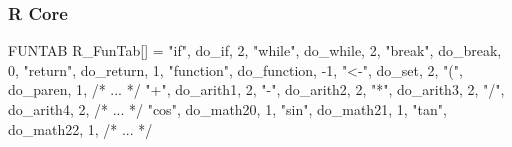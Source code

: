 \documentclass{beamer}
\begin{document}
\begin{frame}[fragile]
    \frametitle{R Core}

\begin{ccode}
FUNTAB R_FunTab[] = {
  {"if",        do_if,        2},
  {"while",     do_while,     2},
  {"break",     do_break,     0},
  {"return",    do_return,    1},
  {"function",  do_function,  -1},
  {"<-",        do_set,       2},
  {"(",         do_paren,     1},
  /* ... */
  {"+",         do_arith1,    2},
  {"-",         do_arith2,    2},
  {"*",         do_arith3,    2},
  {"/",         do_arith4,    2},
  /* ... */
  {"cos",       do_math20,    1},
  {"sin",       do_math21,    1},
  {"tan",       do_math22,    1},
  /* ... */ }
\end{ccode}

    \begin{overlayarea}{\textwidth}{0cm}
    \end{overlayarea}


\end{frame}
\end{document}
